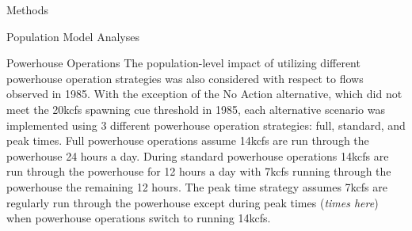 \documentclass[12pt]{article}
\begin{document}
\begin{section}{Methods}
\begin{subsection}{Population Model Analyses}
\begin{subsubsection}{Powerhouse Operations}
The population-level impact of utilizing different powerhouse operation strategies was also considered with respect to flows observed in 1985.  With the exception of the No Action alternative, which did not meet the 20kcfs spawning cue threshold in 1985, each alternative scenario was implemented using 3 different powerhouse operation strategies: full, standard, and peak times.  Full powerhouse operations assume 14kcfs are run through the powerhouse 24 hours a day.  During standard powerhouse operations 14kcfs are run through the powerhouse for 12 hours a day with 7kcfs running through the powerhouse the remaining 12 hours.  The peak time strategy assumes 7kcfs are regularly run through the powerhouse except during peak times (\textit{times here}) when powerhouse operations switch to running 14kcfs.   
\end{subsubsection}  
\end{subsection}
\end{section}
\end{document}
